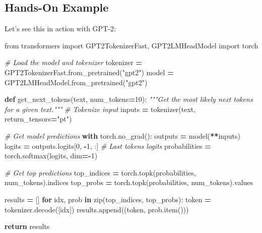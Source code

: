 \documentclass[
]{book}
\newenvironment{Shaded}{\begin{snugshade}}{\end{snugshade}}
\newcommand{\BuiltInTok}[1]{#1}
\newcommand{\CommentTok}[1]{\textcolor[rgb]{0.56,0.35,0.01}{\textit{#1}}}
\newcommand{\ControlFlowTok}[1]{\textcolor[rgb]{0.13,0.29,0.53}{\textbf{#1}}}
\newcommand{\DecValTok}[1]{\textcolor[rgb]{0.00,0.00,0.81}{#1}}
\newcommand{\ImportTok}[1]{#1}
\newcommand{\KeywordTok}[1]{\textcolor[rgb]{0.13,0.29,0.53}{\textbf{#1}}}
\newcommand{\NormalTok}[1]{#1}
\newcommand{\OperatorTok}[1]{\textcolor[rgb]{0.81,0.36,0.00}{\textbf{#1}}}
\newcommand{\StringTok}[1]{\textcolor[rgb]{0.31,0.60,0.02}{#1}}
\begin{document}
\subsection{Hands-On Example}\label{hands-on-example}

Let's see this in action with GPT-2:

\begin{Shaded}
\begin{Highlighting}[]
\ImportTok{from}\NormalTok{ transformers }\ImportTok{import}\NormalTok{ GPT2TokenizerFast, GPT2LMHeadModel}
\ImportTok{import}\NormalTok{ torch}

\CommentTok{\# Load the model and tokenizer}
\NormalTok{tokenizer }\OperatorTok{=}\NormalTok{ GPT2TokenizerFast.from\_pretrained(}\StringTok{"gpt2"}\NormalTok{)}
\NormalTok{model }\OperatorTok{=}\NormalTok{ GPT2LMHeadModel.from\_pretrained(}\StringTok{"gpt2"}\NormalTok{)}

\KeywordTok{def}\NormalTok{ get\_next\_tokens(text, num\_tokens}\OperatorTok{=}\DecValTok{10}\NormalTok{):}
    \CommentTok{"""Get the most likely next tokens for a given text."""}
    \CommentTok{\# Tokenize input}
\NormalTok{    inputs }\OperatorTok{=}\NormalTok{ tokenizer(text, return\_tensors}\OperatorTok{=}\StringTok{"pt"}\NormalTok{)}
    
    \CommentTok{\# Get model predictions}
    \ControlFlowTok{with}\NormalTok{ torch.no\_grad():}
\NormalTok{        outputs }\OperatorTok{=}\NormalTok{ model(}\OperatorTok{**}\NormalTok{inputs)}
\NormalTok{        logits }\OperatorTok{=}\NormalTok{ outputs.logits[}\DecValTok{0}\NormalTok{, }\OperatorTok{{-}}\DecValTok{1}\NormalTok{, :]  }\CommentTok{\# Last token\textquotesingle{}s logits}
\NormalTok{        probabilities }\OperatorTok{=}\NormalTok{ torch.softmax(logits, dim}\OperatorTok{={-}}\DecValTok{1}\NormalTok{)}
    
    \CommentTok{\# Get top predictions}
\NormalTok{    top\_indices }\OperatorTok{=}\NormalTok{ torch.topk(probabilities, num\_tokens).indices}
\NormalTok{    top\_probs }\OperatorTok{=}\NormalTok{ torch.topk(probabilities, num\_tokens).values}
    
\NormalTok{    results }\OperatorTok{=}\NormalTok{ []}
    \ControlFlowTok{for}\NormalTok{ idx, prob }\KeywordTok{in} \BuiltInTok{zip}\NormalTok{(top\_indices, top\_probs):}
\NormalTok{        token }\OperatorTok{=}\NormalTok{ tokenizer.decode([idx])}
\NormalTok{        results.append((token, prob.item()))}
    
    \ControlFlowTok{return}\NormalTok{ results}


\end{Highlighting}
\end{Shaded}
\end{document}
